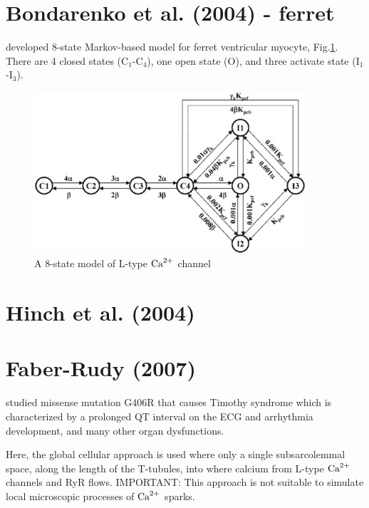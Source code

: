 \section{Bondarenko et al. (2004) - ferret}
\label{sec:LCC_Bondarenko2004}

\citep{bondarenko2004mgc,bondarenko2004cma} developed 8-state Markov-based model
for ferret ventricular myocyte, Fig.\ref{fig:LCCmodel_Bondarenko2004}.
There are 4 closed states (C$_1$-C$_4$), one open state (O), and three activate
state (I$_1$-I$_3$).

\begin{figure}[hbt]
  \centerline{\includegraphics[height=6cm,
    angle=0]{./images/LCCmodel_Bondarenko2004.eps}}
\caption{A 8-state model of L-type ${\text{Ca}^{2+}}$ channel}
\label{fig:LCCmodel_Bondarenko2004}
\end{figure}


\section{Hinch et al. (2004)}

\citep{hinch2004slc} 

\section{Faber-Rudy (2007)}
\label{sec:LCC_Faber2007}

\citep{faber2007DHPR} studied missense mutation G406R that causes Timothy
syndrome which is characterized by a prolonged QT interval on the ECG and
arrhythmia development, and many other organ dysfunctions.

Here, the global cellular approach is used where only a single subsarcolemmal
space, along the length of the T-tubules, into where calcium from L-type ${\text{Ca}^{2+}}$
channels and RyR flows. IMPORTANT: This approach is not suitable to simulate
local microscopic processes of ${\text{Ca}^{2+}}$ sparks. 

